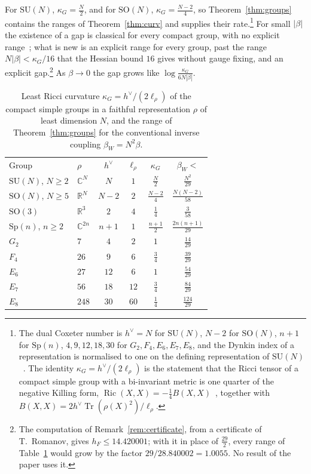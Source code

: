 \documentclass[aps,prd,twocolumn,superscriptaddress,nofootinbib,longbibliography,floatfix,amsmath,amssymb,10pt]{revtex4-2}
\theoremstyle{definition}
\theoremstyle{remark}
\newcommand{\R}{\mathbb{R}}
\newcommand{\C}{\mathbb{C}}
\newcommand{\SU}{\mathrm{SU}}
\newcommand{\SO}{\mathrm{SO}}
\newcommand{\Tr}{\operatorname{Tr}}
\newcommand{\Ric}{\operatorname{Ric}}
\begin{document}
For $\SU(N)$, $\kappa_G=\frac N2$, and for $\SO(N)$, $\kappa_G=\frac{N-2}4$, so
Theorem~\ref{thm:groups} contains the ranges of Theorem~\ref{thm:curv} and
supplies their rate.\footnote{The dual Coxeter number is $h^\vee=N$ for $\SU(N)$, $N-2$ for
$\SO(N)$, $n+1$ for $\mathrm{Sp}(n)$, $4,9,12,18,30$ for $G_2,F_4,E_6,E_7,E_8$, and
the Dynkin index of a representation is normalised to one on the defining
representation of $\SU(N)$~\cite[Ch.~6]{Kac90}. The identity
$\kappa_G=h^\vee/(2\ell_\rho)$ is the statement that the Ricci tensor of a
compact simple group with a bi-invariant metric is one quarter of the
negative Killing form, $\Ric(X,X)=-\frac14B(X,X)$~\cite{Mil76}, together with
$B(X,X)=2h^\vee\Tr(\rho(X)^2)/\ell_\rho$.} For small $|\beta|$ the existence of a gap is classical
for every compact group, with no explicit range~\cite[Thm.~3.6]{OSei78}; what is new is an explicit range for
every group, past the range $N|\beta|<\kappa_G/16$ that the Hessian bound $16$
gives without gauge fixing, and an explicit gap.\footnote{The computation
of Remark~\ref{rem:certificate}, from a certificate of T.~Romanov, gives
$h_F\le14.420001$; with it in place of $\frac{29}2$, every range of
Table~\ref{tab:groups} would grow by the factor $29/28.840002=1.0055$. No
result of the paper uses it.} As $\beta\to0$ the gap grows like $\log\frac{\kappa_G}{6N|\beta|}$.

\begin{table}[t]
\caption{Least Ricci curvature $\kappa_G=h^\vee/(2\ell_\rho)$ of the compact
simple groups in a faithful representation $\rho$ of least dimension $N$, and
the range of Theorem~\ref{thm:groups} for the conventional inverse coupling
$\beta_W=N^2\beta$.}
\label{tab:groups}
\begin{ruledtabular}
\begin{tabular}{llcccc}
Group&$\rho$&$h^\vee$&$\ell_\rho$&$\kappa_G$&$\beta_W<$\\
\colrule
$\SU(N)$, $N\ge2$&$\C^N$&$N$&$1$&$\frac N2$&$\frac{N^2}{29}$\\
$\SO(N)$, $N\ge5$&$\R^N$&$N-2$&$2$&$\frac{N-2}4$&$\frac{N(N-2)}{58}$\\
$\SO(3)$&$\R^3$&$2$&$4$&$\frac14$&$\frac3{58}$\\
$\mathrm{Sp}(n)$, $n\ge2$&$\C^{2n}$&$n+1$&$1$&$\frac{n+1}2$&$\frac{2n(n+1)}{29}$\\
$G_2$&$7$&$4$&$2$&$1$&$\frac{14}{29}$\\
$F_4$&$26$&$9$&$6$&$\frac34$&$\frac{39}{29}$\\
$E_6$&$27$&$12$&$6$&$1$&$\frac{54}{29}$\\
$E_7$&$56$&$18$&$12$&$\frac34$&$\frac{84}{29}$\\
$E_8$&$248$&$30$&$60$&$\frac14$&$\frac{124}{29}$\\
\end{tabular}
\end{ruledtabular}
\end{table}
\end{document}

